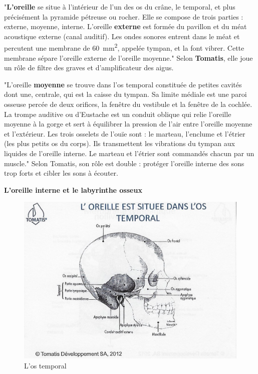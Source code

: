 "\textbf{L'oreille}
se situe à l'intérieur de l'un des os du crâne, le temporal, et plus précisément la pyramide pétreuse ou rocher. Elle se compose de trois parties : externe, moyenne, interne.
L'oreille \textbf{externe} 
est formée du pavillon et du méat acoustique externe
	(canal auditif). Les ondes sonores entrent dans le méat et percutent
	une membrane de \SI{60}{\milli\metre\squared}, appelée tympan, et la font vibrer.
	Cette membrane
	sépare l'oreille externe de l'oreille moyenne."\autocite[ 319--321.]{marieb:biologie}
	Selon \textbf{Tomatis}, elle
	joue un rôle de filtre des graves et d'amplificateur des aigus.
	

"L'oreille \textbf{moyenne }se trouve dans l'os temporal constituée de petites
cavités dont une, centrale, qui est la caisse du tympan. Sa limite
médiale est une paroi osseuse percée de deux orifices, la fenêtre
du vestibule et la fenêtre de la cochlée. La trompe auditive ou d'Eustache
est un conduit oblique qui relie l'oreille moyenne à la gorge et sert
à équilibrer la pression de l'air entre l'oreille moyenne et l'extérieur.
Les trois osselets de l'ouïe sont : le marteau, l'enclume et l'étrier
(les plus petits os du corps). Ils transmettent les vibrations du
tympan aux liquides de l'oreille interne.
Le marteau et l'étrier sont commandés chacun par un muscle."\autocite[319--321.]{marieb:biologie}
Selon Tomatis, son rôle est double : protéger l'oreille interne des sons
trop forts et cibler les sons à écouter.

\textbf{L'oreille interne et le labyrinthe osseux}

\begin{figure}
	\centering
	\includegraphics[width=0.7\linewidth]{images/Loreilleostemporal_crane.jpg}
	\caption[L'os temporal]{L'os temporal}
	\label{fig:loreilleostemporal18}
\end{figure}

